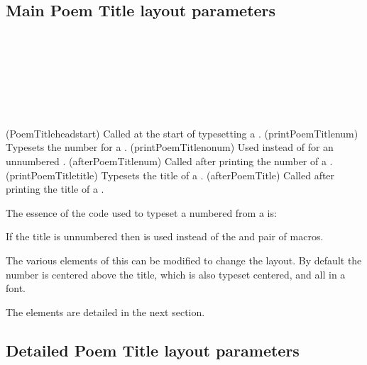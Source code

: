 \subsection{Main Poem Title layout parameters}

\begin{syntax}
\cmd{\PoemTitleheadstart} \\
\cmd{\printPoemTitlenonum} \\
\cmd{\printPoemTitlenum} \\
\cmd{\afterPoemTitlenum} \\
\cmd{\printPoemTitletitle} \\
\cmd{\afterPoemTitle} \\
\end{syntax}
\glossary(PoemTitleheadstart)%
  {}%
  {Called at the start of typesetting a .}
\glossary(printPoemTitlenum)%
  {}%
  {Typesets the number for a .}
\glossary(printPoemTitlenonum)%
  {}%
  {Used instead of  for an unnumbered .}
\glossary(afterPoemTitlenum)%
  {}%
  {Called after printing the number of a .}
\glossary(printPoemTitletitle)%
  {}%
  {Typesets the title of a .}
\glossary(afterPoemTitle)%
  {}%
  {Called after printing the title of a .}


    The essence of the code used to typeset a numbered  from
a \cmd{\PoemTitle} is:
\begin{lcode}
\PoemTitleheadstart
\printPoemTitlenum
\afterPoemTitlenum
{}
\afterPoemTitle
\end{lcode}
If the title is unnumbered then \cmd{\printPoemTitlenonum} is used
instead of the \cmd{\printPoemTitlenum} and 
\cmd{\afterPoemTitlenum} pair of macros.

    The various elements of this can be modified to change the layout.
By default the number is centered above the title, which is also typeset 
centered, and all in a \cmd{\large} font.

    The elements are detailed in the next section.

\subsection{Detailed Poem Title layout parameters}

